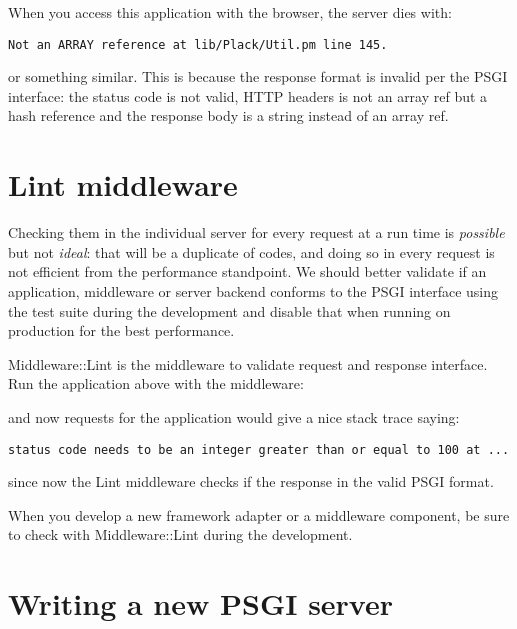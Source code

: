When you access this application with the browser, the server dies with:

\begin{lstlisting}
Not an ARRAY reference at lib/Plack/Util.pm line 145.
\end{lstlisting}

or something similar. This is because the response format is invalid per
the PSGI interface: the status code is not valid, HTTP headers is not an
array ref but a hash reference and the response body is a string instead
of an array ref.

\section{Lint middleware}\label{lint-middleware}

Checking them in the individual server for every request at a run time
is \emph{possible} but not \emph{ideal}: that will be a duplicate of
codes, and doing so in every request is not efficient from the
performance standpoint. We should better validate if an application,
middleware or server backend conforms to the PSGI interface using the
test suite during the development and disable that when running on
production for the best performance.

Middleware::Lint is the middleware to validate request and response
interface. Run the application above with the middleware:


and now requests for the application would give a nice stack trace
saying:

\begin{lstlisting}
status code needs to be an integer greater than or equal to 100 at ...
\end{lstlisting}

since now the Lint middleware checks if the response in the valid PSGI
format.

When you develop a new framework adapter or a middleware component, be
sure to check with Middleware::Lint during the development.

\section{Writing a new PSGI server}\label{writing-a-new-psgi-server}

